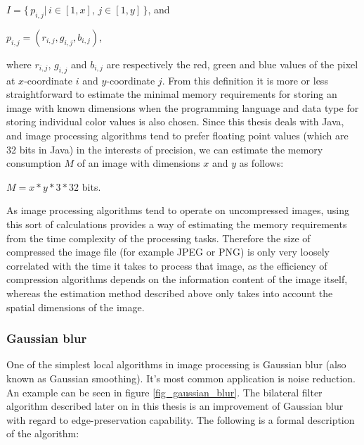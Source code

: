 \documentclass [12pt,a4paper]{report}
\begin{document}
\begin{center}
$I = \{ \, p_{i,j} | \, i \in [1,x], \, j \in [1,y] \, \}$, and

$p_{i,j} = (r_{i,j}, g_{i,j}, b_{i,j})$,
\end{center}
where $r_{i,j}$, $g_{i,j}$ and $b_{i,j}$ are respectively the red, green and blue values of the pixel at $x$-coordinate $i$ and $y$-coordinate $j$. From this definition it is more or less straightforward to estimate the minimal memory requirements for storing an image with known dimensions when the programming language and data type for storing individual color values is also chosen. Since this thesis deals with Java, and image processing algorithms tend to prefer floating point values (which are 32 bits in Java) in the interests of precision, we can estimate the memory consumption $M$ of an image with dimensions $x$ and $y$ as follows:

\begin{center} 
$M = x * y * 3 * 32$ bits.
\end{center}

As image processing algorithms tend to operate on uncompressed images, using this sort of calculations provides a way of estimating the memory requirements from the time complexity of the processing tasks. Therefore the size of compressed the image file (for example JPEG or PNG) is only very loosely correlated with the time it takes to process that image, as the efficiency of compression algorithms depends on the information content of the image itself, whereas the estimation method described above only takes into account the spatial dimensions of the image.

\subsubsection{Gaussian blur}

One of the simplest local algorithms in image processing is Gaussian blur (also known as Gaussian smoothing). It's most common application is noise reduction. An example can be seen in figure \ref{fig_gaussian_blur}. The bilateral filter algorithm described later on in this thesis is an improvement of Gaussian blur with regard to edge-preservation capability. The following is a formal description of the algorithm:

\begin{center}
\begin{algorithm}[h]
\end{algorithm}
\end{center}
\end{document}
